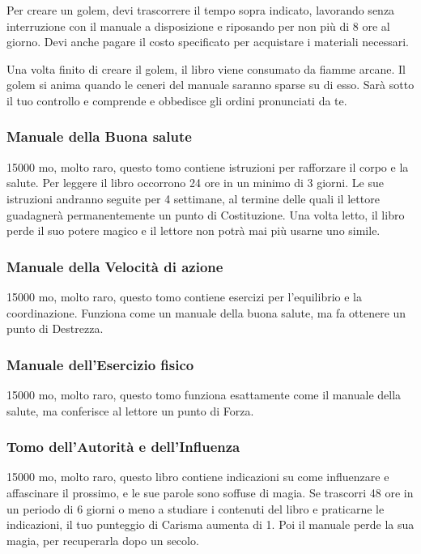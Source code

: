 \begin{multicols}{2}
	\medskip

	Per creare un golem, devi trascorrere il tempo sopra indicato, lavorando senza interruzione con il manuale a disposizione e riposando per non più di 8 ore al giorno. Devi anche pagare il costo specificato per acquistare i materiali necessari.

	Una volta finito di creare il golem, il libro viene consumato da fiamme arcane. Il golem si anima quando le ceneri del manuale saranno sparse su di esso. Sarà sotto il tuo controllo e comprende e obbedisce gli ordini pronunciati da te.

	\subsubsection*{Manuale della Buona salute}
	15000 mo, molto raro, questo tomo contiene istruzioni per rafforzare il corpo e la salute. Per leggere il libro occorrono 24 ore in un minimo di 3 giorni. Le sue istruzioni andranno seguite per 4 settimane, al termine delle quali il lettore guadagnerà permanentemente un punto di Costituzione. Una volta letto, il libro perde il suo potere magico e il lettore non potrà mai più usarne uno simile.

	\subsubsection*{Manuale della Velocità di azione}
	15000 mo, molto raro, questo tomo contiene esercizi per l'equilibrio e la coordinazione. Funziona come un manuale della buona salute, ma fa ottenere un punto di Destrezza.

	\subsubsection*{Manuale dell'Esercizio fisico}
	15000 mo, molto raro, questo tomo funziona esattamente come il manuale della salute, ma conferisce al lettore un punto di Forza.

	\subsubsection*{Tomo dell'Autorità e dell'Influenza}
	15000 mo, molto raro, questo libro contiene indicazioni su come influenzare e affascinare il prossimo, e le sue parole sono soffuse di magia. Se trascorri 48 ore in un periodo di 6 giorni o meno a studiare i contenuti del libro e praticarne le indicazioni, il tuo punteggio di Carisma aumenta di 1. Poi il manuale perde la sua magia, per recuperarla dopo un secolo.


\end{multicols}
